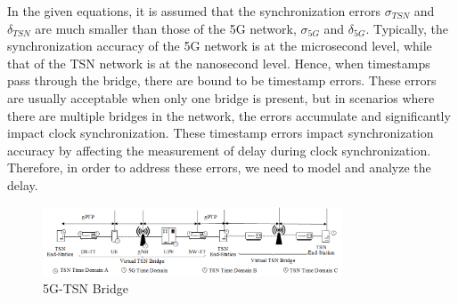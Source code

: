 \documentclass[english]{cccconf}
\begin{document}
In the given equations, it is assumed that the synchronization errors $\sigma_{TSN}$ and $\delta_{TSN}$ are much smaller than those of the 5G network, $\sigma_{5G}$ and $\delta_{5G}$. Typically, the synchronization accuracy of the 5G network is at the microsecond level, while that of the TSN network is at the nanosecond level. Hence, when timestamps pass through the bridge, there are bound to be timestamp errors. These errors are usually acceptable when only one bridge is present, but in scenarios where there are multiple bridges in the network, the errors accumulate and significantly impact clock synchronization. These timestamp errors impact synchronization accuracy by affecting the measurement of delay during clock synchronization. Therefore, in order to address these errors, we need to model and analyze the delay.
\begin{figure}[htbp]
	\centering
	\setcounter{figure}{1}
	\includegraphics[width=3.5in]{fig12.png}
	\caption{5G-TSN Bridge}
\end{figure}
\end{document}
